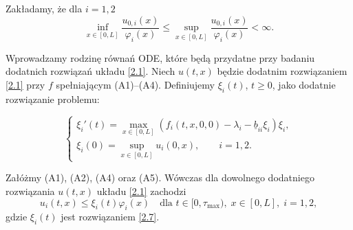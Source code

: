 	Zakładamy, że dla $i=1,2$
	\begin{equation}
	\inf_{x\in [0,L]} \frac{u_{0,i}(x)}{\varphi_i(x)}\le 
	\sup_{x\in [0,L]} \frac{u_{0,i}(x)}{\varphi_i(x)}<\infty.
	\end{equation}
	
	Wprowadzamy rodzinę równań ODE, które będą przydatne przy badaniu dodatnich rozwiązań układu \eqref{2.1}.  
	Niech $u(t,x)$ będzie dodatnim rozwiązaniem \eqref{2.1} przy $f$ spełniającym (A1)–(A4).  
	Definiujemy $\xi_i(t)$, $t\ge 0$, jako dodatnie rozwiązanie problemu:
	
	\begin{equation}
		\label{2.7}
		\begin{cases}
			\xi_i'(t)=\max_{x\in[0,L]} (f_i(t,x,0,0)-\lambda_i-\underline{b}_{ii}\xi_i)\xi_i,\\
			\xi_i(0)=\sup_{x\in[0,L]} u_i(0,x),\qquad i=1,2.
		\end{cases}
	\end{equation}
	
	\begin{lemma}
		Załóżmy (A1), (A2), (A4) oraz (A5).  
		Wówczas dla dowolnego dodatniego rozwiązania $u(t,x)$ układu \eqref{2.1} zachodzi
		\begin{equation}
		u_i(t,x)\le \xi_i(t)\varphi_i(x)\quad \text{dla }t\in[0,\tau_{\max}),\; x\in[0,L],\; i=1,2,
		\end{equation}
		gdzie $\xi_i(t)$ jest rozwiązaniem \eqref{2.7}.
	\end{lemma}
	
